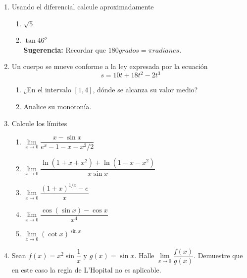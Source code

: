 \documentclass[10pt,twoside]{SelfArx} %
\begin{document}
    \begin{enumerate}%
    	\item Usando el diferencial calcule aproximadamente
    	\begin{enumerate}
    		\item $ \sqrt{5} $
    		\item $ \tan 46^{o} $\\
\textbf{ Sugerencia:}    		Recordar que    		$ 180grados=\pi radianes $.
    	\end{enumerate}
    	\item Un cuerpo se mueve conforme a la ley expresada por la ecuación 
    	\begin{equation}
    	s=10t+18t^{2}-2t^{3}
    	\end{equation}
    	\begin{enumerate}
    		\item ¿En el intervalo $ [1,4] $, dónde se alcanza su valor medio?
    		\item Analice su monotonía.
    	\end{enumerate}
    	
    	\item Calcule los límites
    	  \begin{enumerate}
    	  	\item $ \lim\limits_{x\rightarrow0}\dfrac{x-\sin x}{e^{x}-1-x-x^{2}/2} $
    	  	\item $ \lim\limits_{x\rightarrow0}\dfrac{\ln(1+x+x^{2})+\ln(1-x-x^{2})}{x\sin x} $
    	  	\item $ \lim\limits_{x\rightarrow0}\dfrac{(1+x)^{1/x}-e}{x} $
    	  	\item $ \lim\limits_{x\rightarrow0}\dfrac{\cos(\sin x)-\cos x}{x^{4}} $
    	  	\item $ \lim\limits_{x\rightarrow0}(\cot x)^{\sin x} $
    	  \end{enumerate}
       	\item Sean $ f(x)=x^{2}\sin \dfrac{1}{x} $ y $ g(x)=\sin x $. Halle $ \lim\limits_{x\rightarrow0}\dfrac{f(x)}{g(x)} $. Demuestre que en este caso la regla de L'Hopital no es aplicable.	
    	
    	
    	
    	
    \end{enumerate}%
    
    
    
    
    
    
    
    
    
\end{document}
